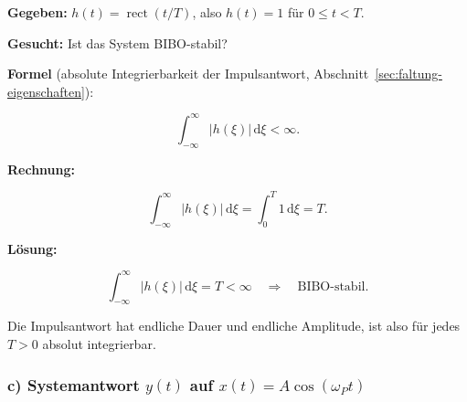 \begin{beispiel}

\textbf{Gegeben:} $h(t) = \operatorname{rect}(t/T)$, also $h(t) = 1$ für
$0 \leq t < T$.

\textbf{Gesucht:} Ist das System BIBO-stabil?

\textbf{Formel} (absolute Integrierbarkeit der Impulsantwort,
Abschnitt~\ref{sec:faltung-eigenschaften}):

$$
\int_{-\infty}^{\infty} |h(\xi)|\,\mathrm{d}\xi < \infty.
$$

\textbf{Rechnung:}

$$
\int_{-\infty}^{\infty} |h(\xi)|\,\mathrm{d}\xi
= \int_{0}^{T} 1\,\mathrm{d}\xi = T.
$$

\textbf{Lösung:}

$$
\boxed{\;\int_{-\infty}^{\infty} |h(\xi)|\,\mathrm{d}\xi = T < \infty
\quad\Longrightarrow\quad \text{BIBO-stabil.}\;}
$$

Die Impulsantwort hat endliche Dauer und endliche Amplitude, ist also für jedes
$T > 0$ absolut integrierbar.

\end{beispiel}

\subsubsection*{c) Systemantwort $y(t)$ auf $x(t) = A\cos(\omega_P t)$}

